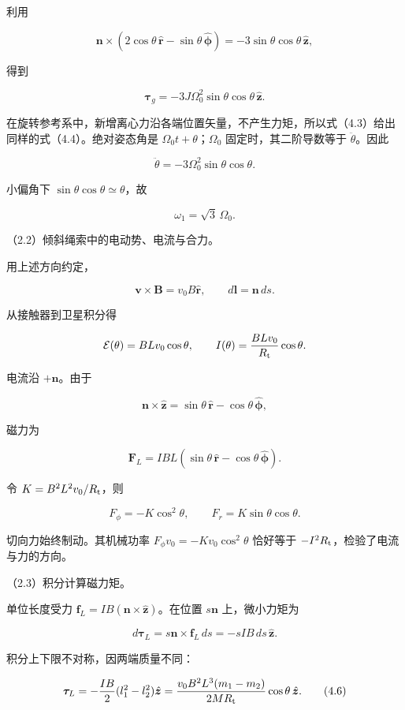 \documentclass[12pt,a4paper,fontset=fandol]{ctexart}
\begin{document}
利用

\[
\boldsymbol n\times(2\cos\theta\,\hat{\boldsymbol r}
-\sin\theta\,\hat{\boldsymbol\phi})
=-3\sin\theta\cos\theta\,\hat{\boldsymbol z},
\]

得到

\[
\boldsymbol\tau_g=-3J\Omega_0^2\sin\theta\cos\theta\,\hat{\boldsymbol z}.
\tag{4.4}
\]

在旋转参考系中，新增离心力沿各端位置矢量，不产生力矩，所以式（4.3）给出同样的式（4.4）。绝对姿态角是
\(\Omega_0t+\theta\)；\(\Omega_0\) 固定时，其二阶导数等于
\(\ddot\theta\)。因此

\[
\ddot\theta=-3\Omega_0^2\sin\theta\cos\theta.
\]

小偏角下 \(\sin\theta\cos\theta\simeq\theta\)，故

\[
\boxed{\omega_1=\sqrt3\,\Omega_0.}
\]

（2.2）倾斜绳索中的电动势、电流与合力。

用上述方向约定，

\[
\boldsymbol v\times\boldsymbol B=v_0B\hat{\boldsymbol r},
\qquad
d\boldsymbol l=\boldsymbol n\,ds.
\]

从接触器到卫星积分得

\[
\mathcal E(\theta)=BLv_0\cos\theta,\qquad
I(\theta)=\frac{BLv_0}{R_{\rm t}}\cos\theta.
\]

电流沿 \(+\boldsymbol n\)。由于

\[
\boldsymbol n\times\hat{\boldsymbol z}
=\sin\theta\,\hat{\boldsymbol r}-\cos\theta\,\hat{\boldsymbol\phi},
\]

磁力为

\[
\boldsymbol F_L=IBL
(\sin\theta\,\hat{\boldsymbol r}-\cos\theta\,\hat{\boldsymbol\phi}).
\]

令 \(K=B^2L^2v_0/R_{\rm t}\)，则

\[
\boxed{F_\phi=-K\cos^2\theta,\qquad
F_r=K\sin\theta\cos\theta.}
\tag{4.5}
\]

切向力始终制动。其机械功率 \(F_\phi v_0=-K v_0\cos^2\theta\) 恰好等于
\(-I^2R_{\rm t}\)，检验了电流与力的方向。

（2.3）积分计算磁力矩。

单位长度受力
\(\boldsymbol f_L=IB(\boldsymbol n\times\hat{\boldsymbol z})\)。在位置
\(s\boldsymbol n\) 上，微小力矩为

\[
d\boldsymbol\tau_L=s\boldsymbol n\times\boldsymbol f_L\,ds
=-sIB\,ds\,\hat{\boldsymbol z}.
\]

积分上下限不对称，因两端质量不同：

\[
\boldsymbol\tau_L
=-\frac{IB}{2}(l_1^2-l_2^2)\hat{\boldsymbol z}
=\frac{v_0B^2L^3(m_1-m_2)}{2MR_{\rm t}}
\cos\theta\,\hat{\boldsymbol z}.
\tag{4.6}
\]
\end{document}
